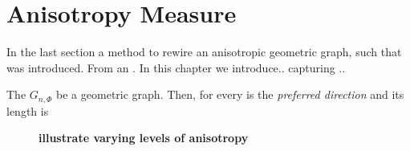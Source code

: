 




\section{Anisotropy Measure}\label{sec:anisotropy_measure}

In the last section a method to rewire an anisotropic geometric graph,
such that was introduced. From an . In this chapter we
introduce.. capturing ..

The $G_{n, \Phi}$ be a geometric graph. Then, for every is the
\textit{preferred direction} and its length is 

\textcite{Mardia_Directional-statistics}
 
\begin{figure}[H]
\caption{\textbf{illustrate varying levels of anisotropy}}
\end{figure}


